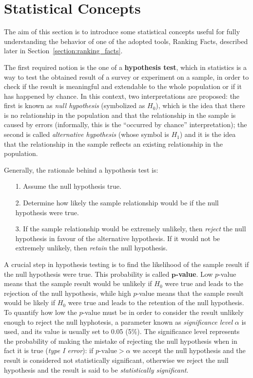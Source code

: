 \section{Statistical Concepts}
\label{section:statistical_concepts}
The aim of this section is to introduce some statistical concepts useful for fully understanding the behavior of one of the adopted tools, Ranking Facts, described later in Section~\ref{section:ranking_facts}.

The first required notion is the one of a \textbf{hypothesis test}, which in statistics is a way to test the obtained result of a survey or experiment on a sample, in order to check if the result is meaningful and extendable to the whole population or if it has happened by chance. In this context, two interpretations are proposed: the first is known as \textit{null hypothesis} (symbolized as \(H_0\)), which is the idea that there is no relationship in the population and that the relationship in the sample is caused by errors (informally, this is the ``occurred by chance'' interpretation); the second is called \textit{alternative hypothesis} (whose symbol is \(H_1\)) and it is the idea that the relationship in the sample reflects an existing relationship in the population.

Generally, the rationale behind a hypothesis test is:
\begin{itemize}
\item[1.] Assume the null hypothesis true.
\item[2.] Determine how likely the sample relationship would be if the null hypothesis were true.
\item[3.] If the sample relationship would be extremely unlikely, then \textit{reject} the null hypothesis in favour of the alternative hypothesis. If it would not be extremely unlikely, then \textit{retain} the null hypothesis.
\end{itemize}

A crucial step in hypothesis testing is to find the likelihood of the sample result if the null hypothesis were true. This probability is called \textbf{\(\bm{p}\)-value}. Low \(p\)-value means that the sample result would be unlikely if \(H_0\) were true and leads to the rejection of the null hypothesis, while high \(p\)-value means that the sample result would be likely if \(H_0\) were true and leads to the retention of the null hypothesis. To quantify how low the \(p\)-value must be in order to consider the result unlikely enough to reject the null hyphotesis, a parameter known as \textit{significance level} \(\alpha\) is used, and its value is usually set to 0.05 (5\%). The significance level represents the probability of making the mistake of rejecting the null hypothesis when in fact it is true (\textit{type I error}): if \(p\textrm{-value} > \alpha\) we accept the null hypothesis and the result is considered not statistically significant, otherwise we reject the null hypothesis and the result is said to be \textit{statistically significant}.

